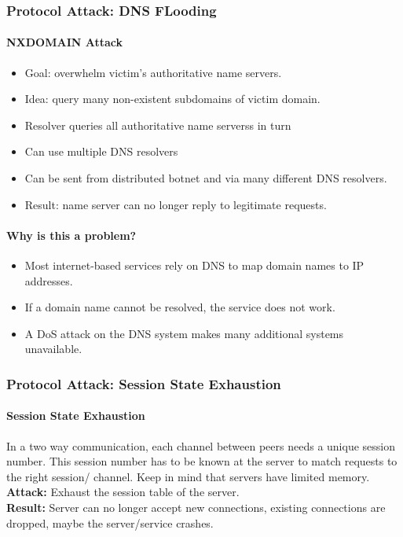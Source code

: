 \subsubsection{Protocol Attack: DNS FLooding}

\paragraph{NXDOMAIN Attack}
\begin{itemize}
    \item Goal: overwhelm victim's authoritative name servers.
    \item Idea: query many non-existent subdomains of victim domain.
    \item Resolver queries all authoritative name serverss in turn
    \item Can use multiple DNS resolvers
    \item Can be sent from distributed botnet and via many different DNS resolvers.
    \item Result: name server can no longer reply to legitimate requests.
\end{itemize}

\paragraph{Why is this a problem?}
\begin{itemize}
    \item Most internet-based services rely on DNS to map domain names to IP addresses.
    \item If a domain name cannot be resolved, the service does not work.
    \item A DoS attack on the DNS system makes many additional systems unavailable.
\end{itemize}

\subsubsection{Protocol Attack: Session State Exhaustion}

\paragraph{Session State Exhaustion}
In a two way communication, each channel between peers needs a unique session number. This session number has to be known at the server to match requests to the right session/ channel. Keep in mind that servers have limited memory.\\
\noindent\textbf{Attack:} Exhaust the session table of the server.\\
\textbf{Result:} Server can no longer accept new connections, existing connections are dropped, maybe the server/service crashes.

